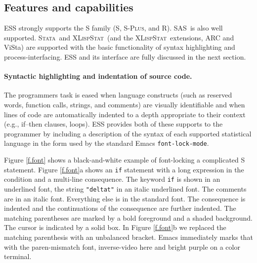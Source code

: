 \documentclass{article}
\newcommand*{\SAS}{\textsc{SAS}}
\newcommand*{\Splus}{\textsc{S-Plus}}
\newcommand*{\XLispStat}{\textsc{XLispStat}}
\newcommand*{\Stata}{\textsc{Stata}}
\newcommand{\stexttt}[1]{{\small\texttt{#1}}}
\begin{document}


\subsection{Features and capabilities}
\label{sec:ESS:features}

ESS strongly supports the S family (S, \Splus, and R).
\SAS\ is also well supported.  \Stata\
and \XLispStat\ (and the \XLispStat\ extensions, ARC and ViSta) are
supported with the basic functionality of syntax highlighting and
process-interfacing.  ESS and its interface are fully discussed in the
next section.

\paragraph{Syntactic highlighting and indentation of source code.}
The programmers task is eased when language constructs (such as
reserved words, function calls, strings, and comments) are visually
identifiable and when lines of code are automatically indented to a
depth appropriate to their context (e.g., if--then clauses, loops).
ESS provides both of these supports to the programmer by
including a description of the syntax of each
supported statistical language in the form used by the standard Emacs
\stexttt{font-lock-mode}.  

Figure \ref{f.font} shows a black-and-white example of font-locking a
complicated S statement.  Figure \ref{f.font}a shows an \stexttt{if}
statement with a long expression in the condition and a multi-line
consequence.  The keyword \stexttt{if} is shown in an underlined font,
the string \stexttt{"deltat"} in an italic underlined font.  The
comments are in an italic font.  Everything else is in the standard
font.  The consequence is indented and the continuations of the
consequence are further indented.  The matching parentheses are marked
by a bold foreground and a shaded background.  The cursor is indicated
by a solid box.  In Figure \ref{f.font}b we replaced the matching
parenthesis with an unbalanced bracket.  Emacs immediately marks that
with the paren-mismatch font, inverse-video here and bright purple on
a color terminal.
\end{document}
